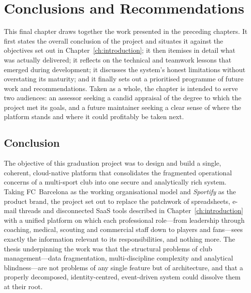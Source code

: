 \chapter{Conclusions and Recommendations}
\label{ch:conclusion}

This final chapter draws together the work presented in the preceding chapters. It first
states the overall conclusion of the project and situates it against the objectives set out
in Chapter~\ref{ch:introduction}; it then itemises in detail what was actually delivered;
it reflects on the technical and teamwork lessons that emerged during development; it
discusses the system's honest limitations without overstating its maturity; and it finally
sets out a prioritised programme of future work and recommendations. Taken as a whole, the
chapter is intended to serve two audiences: an assessor seeking a candid appraisal of the
degree to which the project met its goals, and a future maintainer seeking a clear sense of
where the platform stands and where it could profitably be taken next.

\section{Conclusion}
\label{sec:conclusion-summary}

The objective of this graduation project was to design and build a single, coherent,
cloud-native platform that consolidates the fragmented operational concerns of a
multi-sport club into one secure and analytically rich system. Taking FC~Barcelona as
the working organisational model and \textit{Sportify} as the product brand, the
project set out to replace the patchwork of spreadsheets, e-mail threads and
disconnected SaaS tools described in Chapter~\ref{ch:introduction} with a unified platform
on which each professional role---from leadership through coaching, medical, scouting and
commercial staff down to players and fans---sees exactly the information relevant to its
responsibilities, and nothing more. The thesis underpinning the work was that the
structural problems of club management---data fragmentation, multi-discipline complexity
and analytical blindness---are not problems of any single feature but of architecture, and
that a properly decomposed, identity-centred, event-driven system could dissolve them at
their root.

